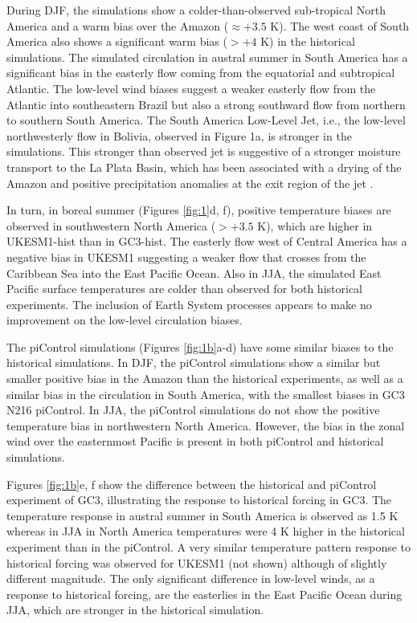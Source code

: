  During DJF, the simulations show a colder-than-observed sub-tropical North America and a warm bias over the Amazon ($\approx +3.5$ K).
 The west coast of South America also shows a significant warm bias ($>+4$ K) in the historical simulations.
 The simulated circulation in austral summer in South America has a significant bias in the easterly flow coming from the equatorial and subtropical Atlantic.
 The low-level wind biases suggest a weaker easterly flow from the Atlantic into southeastern Brazil but also a strong southward flow from northern to southern South America.
  The South America Low-Level Jet, i.e., the low-level northwesterly flow in Bolivia, observed in Figure 1a, is stronger in the simulations.
   This stronger than observed jet is suggestive of a stronger moisture transport to the La Plata Basin, which has been associated with a drying of the Amazon and positive precipitation anomalies at the exit region of the jet \citep{marengo2012,jones2017}.


In turn, in boreal summer (Figures \ref{fig:1}d, f), positive temperature biases are observed in southwestern North America ($>+3.5 $ K), which are higher in UKESM1-hist than in GC3-hist.
 The easterly flow west of Central America has a negative bias in UKESM1 suggesting a weaker flow that crosses from the Caribbean Sea into the East Pacific Ocean.
 Also in JJA, the simulated East Pacific surface temperatures are colder than observed for both historical experiments.      The inclusion of Earth System processes appears to make no  improvement on the low-level circulation biases. 

The piControl simulations (Figures \ref{fig:1b}a-d) have some similar biases to the historical simulations.
 In DJF, the piControl simulations show a similar but smaller positive bias in the Amazon than the historical experiments, as well as a similar bias in the circulation in South America, with the smallest biases in GC3 N216 piControl.
 In JJA, the piControl simulations do not show the positive temperature bias in northwestern North America. However, the bias in the zonal wind over the easternmost Pacific is present in both piControl and historical simulations.
 
 Figures \ref{fig:1b}e, f show the difference between the historical and piControl experiment of GC3, illustrating the response to historical forcing in GC3.
 The temperature response in austral summer in South America is observed as 1.5 K whereas in JJA in North America temperatures were 4 K higher in the historical experiment than in the piControl.
 A very similar temperature pattern response to historical forcing was observed for UKESM1 (not shown) although of slightly different magnitude. The only significant difference in low-level winds, as a response to historical forcing, are the easterlies in the East Pacific Ocean during JJA, which are stronger in the historical simulation. %

